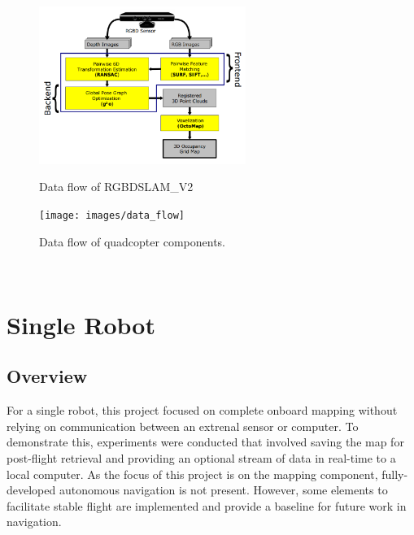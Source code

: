 \documentclass[letterpaper, oneside, 10pt]{report}
\begin{document}
\begin{figure}[h!]
 \caption{Data flow of RGBDSLAM\_V2 \cite{endres2012evaluation}}
 \centering
   \includegraphics[width=0.6\textwidth]{images/rgbdslam}
 \label{fig: rgbdslam.}
\end{figure}

\begin{figure}[h!]
 \caption{Data flow of quadcopter components.}
 \centering
   \texttt{[image: images/data\_flow]}
 \label{fig: data flow.}
\end{figure} \\

\chapter{Single Robot}

\section{Overview}
For a single robot, this project focused on complete onboard mapping without relying on communication between an extrenal sensor or computer. To demonstrate this, experiments were conducted that involved saving the map for post-flight retrieval and providing an optional stream of data in real-time to a local computer. As the focus of this project is on the mapping component, fully-developed autonomous navigation is not present. However, some elements to facilitate stable flight are implemented and provide a baseline for future work in navigation.
\end{document}
